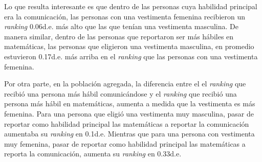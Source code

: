 Lo que resulta interesante es que dentro de las personas cuya habilidad principal era la comunicación, las personas con una vestimenta femenina recibieron un \textit{ranking} 0.06d.e. más alto que las que tenían una vestimenta masculina. De manera similar, dentro de las personas que reportaron ser más hábiles en matemáticas, las personas que eligieron una vestimenta masculina, en promedio estuvieron 0.17d.e. más arriba en el \textit{ranking} que las personas con una vestimenta femenina. 

Por otra parte, en la población agregada, la diferencia entre el el \textit{ranking} que recibió una persona más hábil comunicándose y el \textit{ranking} que recibió una persona más hábil en matemáticas, aumenta a medida que la vestimenta es más femenina. Para una persona que eligió una vestimenta muy masculina, pasar de reportar como habilidad principal las matemáticas a reportar la comunicación aumentaba su \textit{ranking} en 0.1d.e. Mientras que para una persona con vestimenta muy femenina, pasar de reportar como habilidad principal las matemáticas a reporta la comunicación, aumenta su \textit{ranking} en 0.33d.e. 

